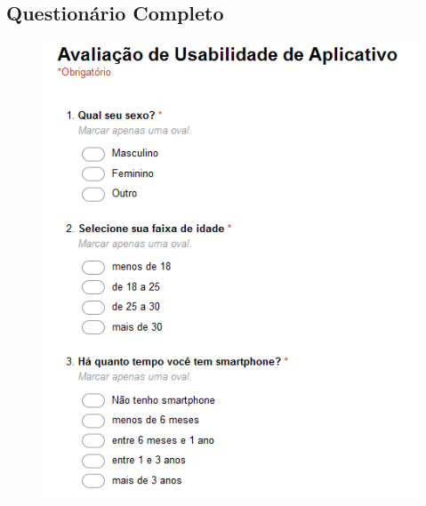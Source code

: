 \documentclass[
	12pt,				%
	openany,			%
	oneside,			%
	a4paper,			%
	english,			%
	french,				%
	spanish,			%
	brazil				%
	]{abntex2}
\begin{document}


%
%


\begin{apendicesenv}


\partapendices


\chapter{Questionário Completo}
\begin{figure}[H]
    \centering

\includegraphics[width=17cm]{figuras/1.png}
\par


\end{figure}
\end{apendicesenv}
\end{document}
